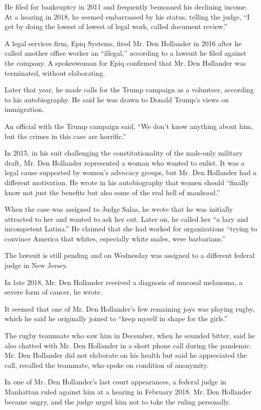 He filed for bankruptcy in 2011 and frequently bemoaned his declining
income. At a hearing in 2018, he seemed embarrassed by his status,
telling the judge, ``I get by doing the lowest of lowest of legal work,
called document review.''

A legal services firm, Epiq Systems, fired Mr. Den Hollander in 2016
after he called another office worker an ``illegal,'' according to a
lawsuit he filed against the company. A spokeswoman for Epiq confirmed
that Mr. Den Hollander was terminated, without elaborating.

Later that year, he made calls for the Trump campaign as a volunteer,
according to his autobiography. He said he was drawn to Donald Trump's
views on immigration.

An official with the Trump campaign said, ``We don't know anything about
him, but the crimes in this case are horrific.''

In 2015, in his suit challenging the constitutionality of the male-only
military draft, Mr. Den Hollander represented a woman who wanted to
enlist. It was a legal cause supported by women's advocacy groups, but
Mr. Den Hollander had a different motivation. He wrote in his
autobiography that women should ``finally know not just the benefits but
also some of the real hell of manhood.''

When the case was assigned to Judge Salas, he wrote that he was
initially attracted to her and wanted to ask her out. Later on, he
called her ``a lazy and incompetent Latina.'' He claimed that she had
worked for organizations ``trying to convince America that whites,
especially white males, were barbarians.''

The lawsuit is still pending and on Wednesday was assigned to a
different federal judge in New Jersey.

In late 2018, Mr. Den Hollander received a diagnosis of mucosal
melanoma, a severe form of cancer, he wrote.

It seemed that one of Mr. Den Hollander's few remaining joys was playing
rugby, which he said he originally joined to ``keep myself in shape for
the girls.''

The rugby teammate who saw him in December, when he sounded bitter, said
he also chatted with Mr. Den Hollander in a short phone call during the
pandemic. Mr. Den Hollander did not elaborate on his health but said he
appreciated the call, recalled the teammate, who spoke on condition of
anonymity.

In one of Mr. Den Hollander's last court appearances, a federal judge in
Manhattan ruled against him at a hearing in February 2018. Mr. Den
Hollander became angry, and the judge urged him not to take the ruling
personally.

